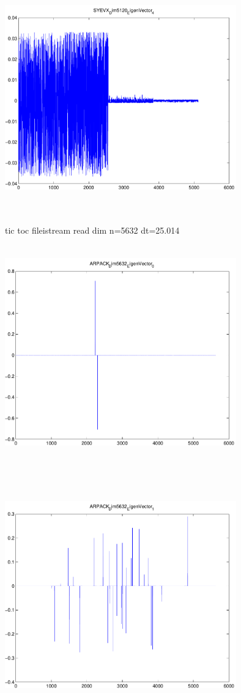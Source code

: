 \documentclass[9pt]{article}
\theoremstyle{plain}
\theoremstyle{definition}
\theoremstyle{remark}
\numberwithin{equation}{section}
\begin{document}
\includegraphics[width=10.0cm,height=10.0cm]{SYEVX_Dim5120_EigenVector_4.pdf}

tic toc fileistream read dim n=5632 dt=25.014
\includegraphics[width=10.0cm,height=10.0cm]{ARPACK_Dim5632_EigenVector_0.pdf}

\includegraphics[width=10.0cm,height=10.0cm]{ARPACK_Dim5632_EigenVector_1.pdf}
\end{document}
